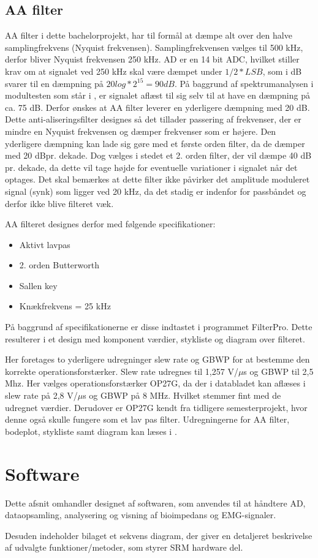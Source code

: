 \subsection{AA filter}

AA filter i dette bachelorprojekt, har til formål at dæmpe alt over den halve samplingfrekvens (Nyquist frekvensen). Samplingfrekvensen vælges til 500 kHz, derfor bliver Nyquist frekvensen 250 kHz. AD er en 14 bit ADC, hvilket stiller krav om at signalet ved 250 kHz skal være dæmpet under $1/2*LSB$, som i dB svarer til en dæmpning på $20log*2^{15}=90dB$. På baggrund af spektrumanalysen i modultesten som står i , er signalet aflæst til sig selv til at have en dæmpning på ca. 75 dB. Derfor ønskes at AA filter leverer en yderligere dæmpning med 20 dB. Dette anti-aliseringsfilter designes så det tillader passering af frekvenser, der er mindre en Nyquist frekvensen og dæmper frekvenser som er højere. Den yderligere dæmpning kan lade sig gøre med et første orden filter, da de dæmper med 20 dBpr. dekade. Dog vælges i stedet et 2. orden filter, der vil dæmpe 40 dB pr. dekade, da dette vil tage højde for eventuelle variationer i signalet når det optages. Det skal bemærkes at dette filter ikke påvirker det amplitude moduleret signal (synk) som ligger ved 20 kHz, da det stadig er indenfor for passbåndet og derfor ikke blive filteret væk.

AA filteret designes derfor med følgende specifikationer:
\begin{itemize}
\item Aktivt lavpas
\item 2. orden Butterworth
\item Sallen key
\item Knækfrekvens = 25 kHz
\end{itemize}

På baggrund af specifikationerne er disse indtastet i programmet FilterPro. Dette resulterer i et design med komponent værdier, stykliste og diagram over filteret. 

Her foretages to yderligere udregninger slew rate og GBWP for at bestemme den korrekte operationsforstærker. Slew rate udregnes til 1,257 V/$\mu$s og GBWP til 2,5 Mhz. Her vælges operationsforstærker OP27G, da der i databladet kan aflæses i slew rate på 2,8 V/$\mu$s og GBWP på 8 MHz. Hvilket stemmer fint med de udregnet værdier. Derudover er OP27G kendt fra tidligere semesterprojekt, hvor denne også skulle fungere som et lav pas filter. Udregningerne for AA filter, bodeplot, stykliste samt diagram kan læses i .


\section{Software}

Dette afsnit omhandler designet af softwaren, som anvendes til at håndtere AD, dataopsamling, analysering og visning af bioimpedans og EMG-signaler.


 
Desuden indeholder bilaget et sekvens
diagram, der giver en detaljeret beskrivelse af udvalgte funktioner/metoder, som styrer
SRM hardware del.